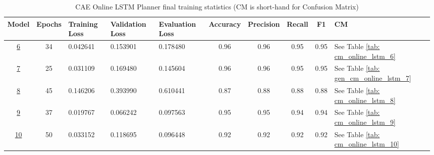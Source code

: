 \pagebreak

\begin{table}[h!]
    \footnotesize
    \centerfloat
    \begin{tabular}{|c|c|M{1.3cm}|M{1.5cm}|M{1.5cm}|c|c|c|c|M{0.7cm}|}
         \hline
         \textbf{Model} & \textbf{Epochs} & \textbf{Training Loss} & \textbf{Validation Loss} & \textbf{Evaluation Loss} & \textbf{Accuracy} & \textbf{Precision} & \textbf{Recall} & \textbf{F1} & \textbf{CM} \\
         \hline
         \hyperref[tab: evalalgorithms]{6} & 34 & 0.042641 & 0.153901 & 0.178480 & 0.96 & 0.96 & 0.95 & 0.95 & See Table \ref{tab: cm_online_lstm_6} \\
         \hline
         \hyperref[tab: evalalgorithms]{7} & 25 & 0.031109 & 0.169480 & 0.145604 & 0.96 & 0.96  & 0.95 & 0.95 & See Table \ref{tab: gen_cm_online_lstm_7} \\
         \hline
         \hyperref[tab: evalalgorithms]{8} & 45 & 0.146206 & 0.393990 & 0.610441 & 0.87 & 0.88 & 0.88 & 0.88 & See Table \ref{tab: cm_online_lstm_8} \\
         \hline
         \hyperref[tab: evalalgorithms]{9} & 37 & 0.019767 & 0.066242 & 0.097563 & 0.95 & 0.95 & 0.94 & 0.94 & See Table \ref{tab: cm_online_lstm_9} \\
         \hline
         \hyperref[tab: evalalgorithms]{10} & 50 & 0.033152 & 0.118695 & 0.096448 & 0.92 & 0.92 & 0.92 & 0.92 & See Table \ref{tab: cm_online_lstm_10} \\
         \hline
    \end{tabular}
    \caption{CAE Online LSTM Planner final training statistics (CM is short-hand for Confusion Matrix)}
    \label{tab: gen_cae_online_lstm_final_tr_res}
\end{table}

